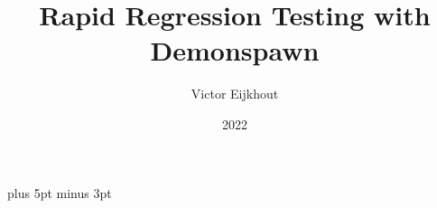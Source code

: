 \documentclass[11pt,headernav]{beamer}
\begin{document}
\parskip=10pt plus 5pt minus 3pt

\title{Rapid Regression Testing with Demonspawn}
\author{ Victor Eijkhout}
\date{2022}

\begin{frame}
  \titlepage
\end{frame}


\end{document}
